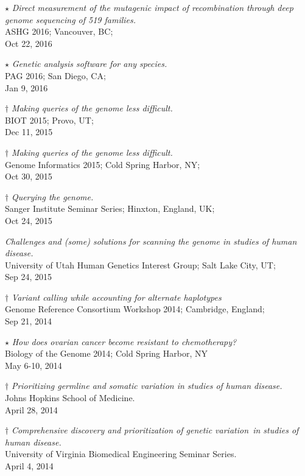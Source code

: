 \documentclass[margin,line]{cv}
\begin{document}
\begin{resume}
    $\star$ \textit{Direct measurement of the mutagenic impact of recombination through deep genome sequencing of 519 families.} \\
    ASHG 2016; Vancouver, BC; \\
    Oct 22, 2016

    $\star$ \textit{Genetic analysis software for any species.} \\
    PAG 2016; San Diego, CA; \\
    Jan 9, 2016

    $\dagger$ \textit{Making queries of the genome less difficult.} \\
    BIOT 2015; Provo, UT; \\
    Dec 11, 2015

    $\dagger$ \textit{Making queries of the genome less difficult.} \\
    Genome Informatics 2015; Cold Spring Harbor, NY; \\
    Oct 30, 2015

    $\dagger$ \textit{Querying the genome.} \\
    Sanger Institute Seminar Series; Hinxton, England, UK; \\
    Oct 24, 2015 

    \textit{Challenges and (some) solutions for scanning the genome in studies of human disease.} \\
    University of Utah Human Genetics Interest Group; Salt Lake City, UT; \\
    Sep 24, 2015

    $\dagger$ \textit{Variant calling while accounting for
    alternate haplotypes} \\
    Genome Reference Consortium Workshop 2014; Cambridge, England; \\
    Sep 21, 2014

    $\star$ \textit{How does ovarian cancer become resistant to chemotherapy?} \\
    Biology of the Genome 2014; Cold Spring Harbor, NY \\
    May 6-10, 2014

    $\dagger$ \textit{Prioritizing germline and somatic variation in studies of human disease.} \\
    Johns Hopkins School of Medicine. \\
    April 28, 2014

    $\dagger$ \textit{Comprehensive discovery and prioritization of genetic variation in studies of human disease.} \\
    University of Virginia Biomedical Engineering Seminar Series. \\
    April 4, 2014


\end{resume}
\end{document}
